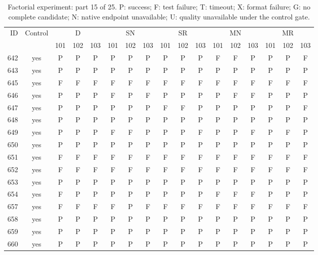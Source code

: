 \begin{table}[p]\centering\footnotesize
\setlength{\tabcolsep}{3pt}
\caption{Factorial experiment: part 15 of 25. P: success; F: test failure; T: timeout; X: format failure; G: no complete candidate; N: native endpoint unavailable; U: quality unavailable under the control gate.}
\begin{tabular*}{\textwidth}{@{\extracolsep{\fill}}rcccccccccccccccc}\toprule
ID & Control & \multicolumn{3}{c}{D} & \multicolumn{3}{c}{SN} & \multicolumn{3}{c}{SR} & \multicolumn{3}{c}{MN} & \multicolumn{3}{c}{MR}\\
\cmidrule(lr){3-5}\cmidrule(lr){6-8}\cmidrule(lr){9-11}\cmidrule(lr){12-14}\cmidrule(lr){15-17}
 & & 101 & 102 & 103 & 101 & 102 & 103 & 101 & 102 & 103 & 101 & 102 & 103 & 101 & 102 & 103\\\midrule
642 & yes & P & P & P & P & P & P & P & P & P & F & F & P & P & P & F\\
643 & yes & P & P & P & P & P & P & P & P & P & P & P & P & P & P & P\\
645 & yes & F & F & F & F & F & F & F & F & F & F & F & F & F & F & F\\
646 & yes & P & P & P & F & P & F & P & P & P & P & F & F & P & P & P\\
647 & yes & P & P & P & P & P & P & F & F & P & P & P & P & P & P & F\\
648 & yes & P & P & P & P & P & P & P & P & P & P & P & P & P & P & P\\
649 & yes & P & P & P & F & F & P & P & P & F & P & P & F & P & F & P\\
650 & yes & P & P & P & P & P & P & P & P & P & P & P & P & P & P & P\\
651 & yes & F & F & F & F & F & F & F & F & F & F & F & F & F & F & F\\
652 & yes & F & F & F & F & F & F & F & F & F & F & F & F & F & F & F\\
653 & yes & P & P & P & P & P & P & P & P & P & P & P & P & P & P & P\\
654 & yes & F & P & P & P & P & P & P & P & P & F & F & F & P & P & P\\
657 & yes & F & F & F & F & P & F & F & F & F & F & F & F & F & F & F\\
658 & yes & P & P & P & P & P & P & P & P & P & P & P & P & P & P & P\\
659 & yes & P & P & P & P & P & P & P & P & P & P & P & P & P & P & P\\
660 & yes & P & P & P & P & P & P & P & P & P & P & P & P & P & P & P\\

\end{tabular*}
\end{table}
